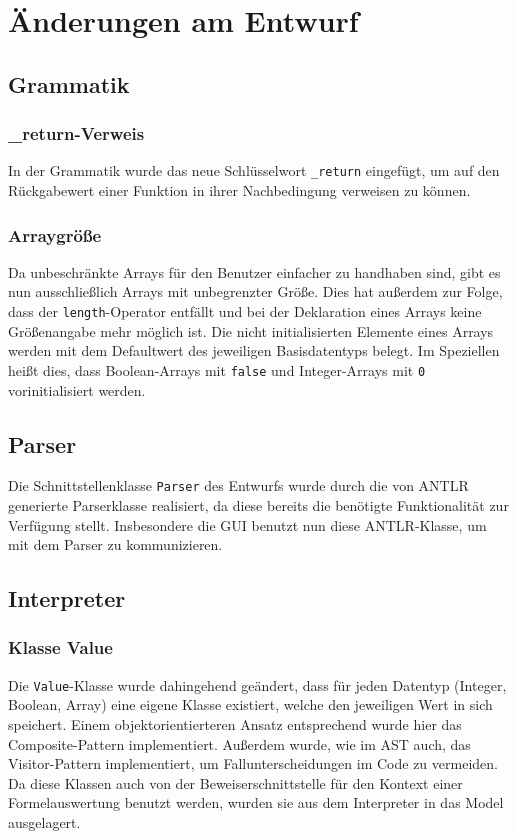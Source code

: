 \section{Änderungen am Entwurf}
\subsection{Grammatik}
\subsubsection{\_return-Verweis}
In der Grammatik wurde das neue Schlüsselwort \texttt{\_return} eingefügt, um auf den Rückgabewert einer Funktion in ihrer Nachbedingung verweisen zu können.

\subsubsection{Arraygröße}
Da unbeschränkte Arrays für den Benutzer einfacher zu handhaben sind, gibt es nun ausschließlich Arrays mit unbegrenzter Größe. Dies hat außerdem zur Folge, dass der \texttt{length}-Operator entfällt und bei der Deklaration eines Arrays keine Größenangabe mehr möglich ist. Die nicht initialisierten Elemente eines Arrays werden mit dem Defaultwert des jeweiligen Basisdatentyps belegt. Im Speziellen heißt dies, dass Boolean-Arrays mit \texttt{false} und Integer-Arrays mit \texttt{0} vorinitialisiert werden.

\subsection{Parser\label{aenderung_parser}}
Die Schnittstellenklasse \texttt{Parser} des Entwurfs wurde durch die von ANTLR generierte Parserklasse realisiert, da diese bereits die benötigte Funktionalität zur Verfügung stellt. Insbesondere die GUI benutzt nun diese ANTLR-Klasse, um mit dem Parser zu kommunizieren.

\subsection{Interpreter}
\subsubsection{Klasse Value}
Die \texttt{Value}-Klasse wurde dahingehend geändert, dass für jeden Datentyp (Integer, Boolean, Array) eine eigene Klasse existiert, welche den jeweiligen Wert in sich speichert. Einem objektorientierteren Ansatz entsprechend wurde hier das Composite-Pattern implementiert. Außerdem wurde, wie im AST auch, das Visitor-Pattern implementiert, um Fallunterscheidungen im Code zu vermeiden. Da diese Klassen auch von der Beweiserschnittstelle für den Kontext einer Formelauswertung benutzt werden, wurden sie aus dem Interpreter in das Model ausgelagert.

